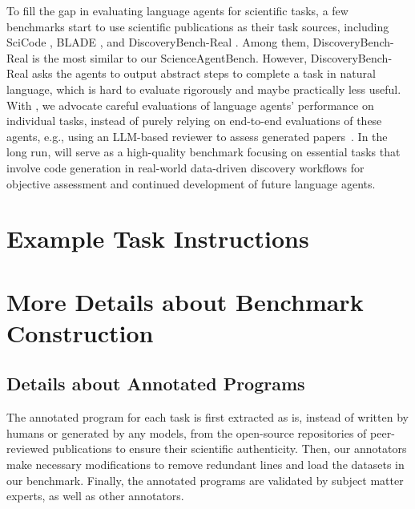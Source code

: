 %
To fill the gap in evaluating language agents for scientific tasks, a few benchmarks start to use scientific publications as their task sources, including SciCode \citep{tian2024scicoderesearchcodingbenchmark}, BLADE \citep{gu2024bladebenchmarkinglanguagemodel}, and DiscoveryBench-Real \citep{majumder2024discoverybenchdatadrivendiscoverylarge}.
Among them, DiscoveryBench-Real is the most similar to our ScienceAgentBench.
However, DiscoveryBench-Real asks the agents to output abstract steps to complete a task in natural language, which is hard to evaluate rigorously and maybe practically less useful.
With \bench, we advocate careful evaluations of language agents' performance on individual tasks, instead of purely relying on end-to-end evaluations of these agents, e.g., using an LLM-based reviewer to assess generated papers~\citep{lu2024aiscientistfullyautomated}.
In the long run, \bench will serve as a high-quality benchmark focusing on essential tasks that involve code generation in real-world data-driven discovery workflows for objective assessment and continued development of future language agents.
%

\newpage
\setcounter{table}{0}
\renewcommand\thetable{\Alph{section}.\arabic{table}}
\setcounter{figure}{0}
\renewcommand\thefigure{\Alph{section}.\arabic{figure}}

\section{Example Task Instructions}
\label{app:task_insts}



\newpage
\setcounter{table}{0}
\renewcommand\thetable{\Alph{section}.\arabic{table}}
\setcounter{figure}{0}
\renewcommand\thefigure{\Alph{section}.\arabic{figure}}

\section{More Details about Benchmark Construction}
\label{app:bench_details}

\subsection{Details about Annotated Programs}
\label{app:prog_details}
The annotated program for each task is first extracted as is, instead of written by humans or generated by any models, from the open-source repositories of peer-reviewed publications to ensure their scientific authenticity. Then, our annotators make necessary modifications to remove redundant lines and load the datasets in our benchmark. Finally, the annotated programs are validated by subject matter experts, as well as other annotators.

